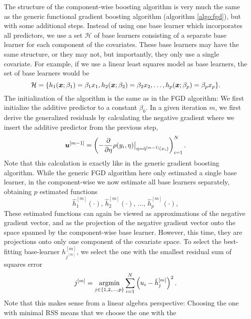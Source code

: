The structure of the component-wise boosting algorithm is very much the same as the generic functional gradient boosting algorithm (algorithm \ref{algo:fgd}), but with some additional steps.
Instead of using one base learner which incorporates all predictors,
we use a set $\mathcal{H}$ of base learners consisting of a separate base learner for each component of the covariates.
These base learners may have the same structure, or they may not, but importantly, they only use a single covariate.
For example, if we use a linear least squares model as base 
learners, the set of base learners would be
\begin{equation*}
    \mathcal{H}=\{h_1(\bm{x};\beta_1)=\beta_1 x_1,h_2(\bm{x};\beta_2)=\beta_2 x_2,\ldots,h_p(\bm{x};\beta_p)=\beta_p x_p \}.
\end{equation*}
The initialization of the algorithm is the same as in the FGD algorithm:
We first initialize the additive predictor to a constant $\beta_0$.
In a given iteration $m$, we first derive the generalized residuals by calculating 
the negative gradient where we insert the additive predictor from the previous step,
\begin{equation*}
    \bm{u}^{[m-1]}=\left(-\frac{\partial}{\partial \eta}\rho(y_i, \eta)\big\rvert_{\eta=\hat{\eta}^{[m-1]}(x_i)}\right)_{i=1}^N.
\end{equation*}
Note that this calculation is exactly like in the generic gradient boosting algorithm.
While the generic FGD algorithm here only estimated a single base learner, in the component-wise we now estimate all base learners separately, obtaining $p$ estimated functions
\begin{equation*}
    \hat{h}_1^{[m]}(\cdot),\,\hat{h}_2^{[m]}(\cdot),\,\ldots,\,\hat{h}_p^{[m]}(\cdot),
\end{equation*}
These estimated functions can again be viewed as approximations of the negative gradient vector, and as the projection of the negative gradient vector onto the space spanned by the component-wise base learner. However, this time, they are projections onto
only one component of the covariate space. To select the best-fitting base-learner $h_{j^{[m]}}^{[m]}$, we select the one with
the smallest residual sum of squares error
\begin{equation*}
    j^{[m]}=\operatorname*{argmin}_{j\in\{1,2,\ldots,p\}}\sum_{i=1}^N \left(u_i-\hat{h}_j^{[m]}\right)^2.
\end{equation*}
Note that this makes sense from a linear algebra perspective: Choosing the one with minimal RSS means that we choose the one with the
